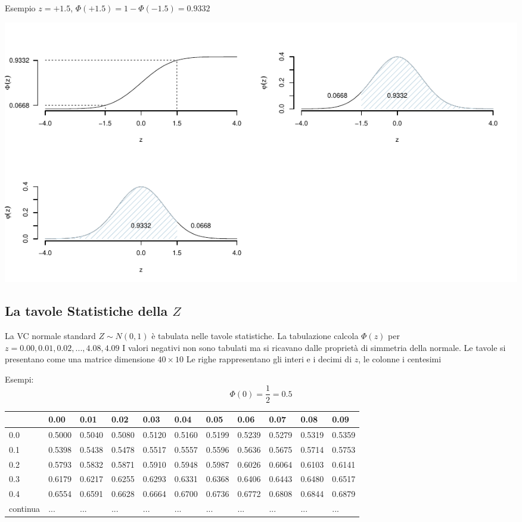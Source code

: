 \documentclass[
  11pt,
]{book}
\theoremstyle{mytheoremstyle}
\theoremstyle{mydefstyle}
\begin{document}
Esempio \(z=+1.5\), \(\Phi(+1.5)=1-\Phi(-1.5)=0.9332\)

\begin{center}\includegraphics{Appunti_di_Statistica_2025_files/figure-latex/07c-Normale-11-1} \end{center}

\subsection{\texorpdfstring{La tavole Statistiche della \(Z\)}{La tavole Statistiche della Z}}\label{la-tavole-statistiche-della-z}

La VC normale standard \(Z\sim N(0,1)\) è tabulata nelle tavole statistiche.
La tabulazione calcola \(\Phi(z)\) per \(z=0.00, 0.01,0.02,...,4.08,4.09\)
I valori negativi non sono tabulati ma si ricavano dalle proprietà di simmetria della normale.
Le tavole si presentano come una matrice dimensione \(40\times 10\)
Le righe rappresentano gli interi e i decimi di \(z\), le colonne i centesimi

Esempi: \[\Phi(0)=\frac 1 2 = 0.5\]

\begin{tabular}{l|>{}l|lllllllll}
\toprule
  & 0.00 & 0.01 & 0.02 & 0.03 & 0.04 & 0.05 & 0.06 & 0.07 & 0.08 & 0.09\\
\midrule
\textcolor[HTML]{AB292E}{0.0} & \textcolor[HTML]{AB292E}{0.5000} & \textcolor[HTML]{AB292E}{0.5040} & \textcolor[HTML]{AB292E}{0.5080} & \textcolor[HTML]{AB292E}{0.5120} & \textcolor[HTML]{AB292E}{0.5160} & \textcolor[HTML]{AB292E}{0.5199} & \textcolor[HTML]{AB292E}{0.5239} & \textcolor[HTML]{AB292E}{0.5279} & \textcolor[HTML]{AB292E}{0.5319} & \textcolor[HTML]{AB292E}{0.5359}\\
\midrule
0.1 & \textcolor[HTML]{AB292E}{0.5398} & 0.5438 & 0.5478 & 0.5517 & 0.5557 & 0.5596 & 0.5636 & 0.5675 & 0.5714 & 0.5753\\
0.2 & \textcolor[HTML]{AB292E}{0.5793} & 0.5832 & 0.5871 & 0.5910 & 0.5948 & 0.5987 & 0.6026 & 0.6064 & 0.6103 & 0.6141\\
0.3 & \textcolor[HTML]{AB292E}{0.6179} & 0.6217 & 0.6255 & 0.6293 & 0.6331 & 0.6368 & 0.6406 & 0.6443 & 0.6480 & 0.6517\\
0.4 & \textcolor[HTML]{AB292E}{0.6554} & 0.6591 & 0.6628 & 0.6664 & 0.6700 & 0.6736 & 0.6772 & 0.6808 & 0.6844 & 0.6879\\
continua & \textcolor[HTML]{AB292E}{...} & ... & ... & ... & ... & ... & ... & ... & ... & ...\\
\bottomrule
\end{tabular}
\end{document}
